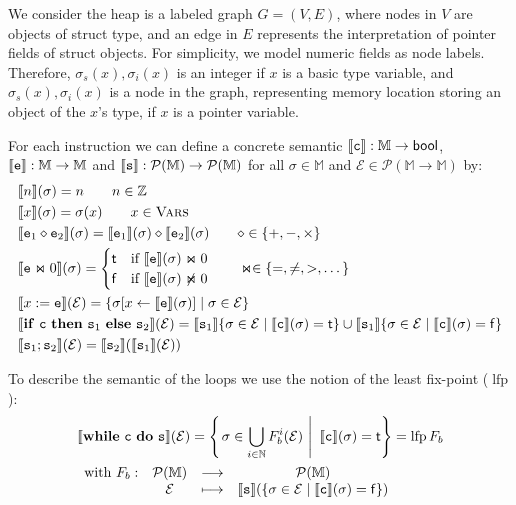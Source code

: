 \documentclass[runningheads]{llncs}
\newcommand\srule{\mathtt{s}}
\newcommand{\erule}{\mathtt{e}}
\newcommand{\crule}{\mathtt{c}}
\newcommand{\ifinst}{\mathbf{if}}
\newcommand{\theninst}{\mathbf{then}}
\newcommand{\elseinst}{\mathbf{else}}
\newcommand{\whileinst}{\mathbf{while}}
\newcommand{\doinst}{\mathbf{do}}
\newcommand{\bool}{\mathsf{bool}}
\newcommand{\True}{\mathsf{t}}
\newcommand{\False}{\mathsf{f}}
\newcommand{\Integer}{\mathbb Z}
\newcommand{\Memory}{\mathbb{M}}
\DeclareMathOperator{\lfp}{lfp}
\begin{document}
We consider the heap is a  labeled graph $G=(V,E)$, where nodes in $V$ are objects of struct type, and an edge in $E$  represents the interpretation of pointer fields of struct objects. For simplicity, we model numeric fields as node labels. 
Therefore, 
$\sigma_s(x), \sigma_i(x) $ is an integer if $x$ is a basic type variable, and 
$\sigma_s(x), \sigma_i(x)$ is a node in the graph, representing memory location storing an object of the $x$'s type,  if $x$ is a pointer variable.  

For each instruction we can define a concrete semantic $\exec{\crule} : \Memory \rightarrow \bool$, $\exec{\erule} : \Memory \rightarrow \Memory$ and $\exec{\srule} : \mathcal{P}(\Memory) \rightarrow \mathcal{P}(\Memory)$ for all $\sigma\in \Memory$ and $\mathcal E \in \mathcal{P}(\Memory \rightarrow \Memory)$ by:
\begin{align*}
	& \exec{n}(\sigma) = n \qquad n \in\Integer \\
	& \exec{x}(\sigma) = \sigma(x) \qquad x\in \vars\\
	& \exec{\erule_1 \diamond \erule_2}(\sigma) = \exec{\erule_1}(\sigma) \diamond \exec{\erule_2}(\sigma) \qquad \diamond \in \{+, -, \times\} \\
	& \exec{\erule \Join 0}(\sigma) = \begin{cases}
		\True & \text {if } \exec{\erule}(\sigma) \Join 0 \\
		\False & \text{if } \exec{\erule}(\sigma) \not\Join 0 
	\end{cases} \qquad \Join\in\{=, \neq, >, \dots\} \\
	& \exec{x := \erule}(\mathcal E) = \{\sigma[x \leftarrow \exec{\erule}(\sigma)] \mid \sigma\in\mathcal{E}\}\\
	& \exec{\ifinst\ \crule\ \theninst \ {\srule_1} \ \elseinst \ {\srule_2}}(\mathcal E) = \exec{\srule_1}\{\sigma \in \mathcal{E} \mid \exec{\crule}(\sigma) = \True\} \cup \exec{\srule_1}\{\sigma \in \mathcal{E} \mid \exec{\crule}(\sigma) = \False\} \\
	& \exec{\srule_1 ; \srule_2}(\mathcal E) = \exec{\srule_2}(\exec{\srule_1}(\mathcal E))
\end{align*}

To describe the semantic of the loops we use the notion of the least fix-point ($\lfp$):
	\begin{align*}
	&\exec{\whileinst \ \crule \ \doinst \ {\srule}}(\mathcal E) = \left\{ \left. \sigma \in \bigcup_{i \in \mathbb N} F_b^i(\mathcal{E}) \ \right| \ \exec{\crule}(\sigma) = \True\right\} = \lfp F_b\\
	&\begin{array}{cccc}
    \text{with } F_b: & \mathcal{P}(\Memory) & \longrightarrow & \mathcal{P}(\Memory)  \\ 
     & \mathcal E & \longmapsto & \exec{\srule} (\{ \sigma \in \mathcal{E} \mid  \exec{\crule}(\sigma) = \False \} )
    \end{array} 
\end{align*}
\end{document}
